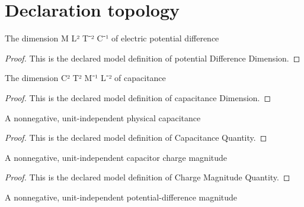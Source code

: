 \section{Declaration topology}
\begin{definition}
  \label{def:physics:phyx-mini-0880:phyxminiproblems-problemphyxmini0880-potentialdifferencedimension}
  The dimension M L² T⁻² C⁻¹ of electric potential difference
\end{definition}
\begin{proof}
  This is the declared model definition of potential Difference Dimension.
\end{proof}
\begin{definition}
  \label{def:physics:phyx-mini-0880:phyxminiproblems-problemphyxmini0880-capacitancedimension}
  The dimension C² T² M⁻¹ L⁻² of capacitance
\end{definition}
\begin{proof}
  This is the declared model definition of capacitance Dimension.
\end{proof}
\begin{definition}
  \label{def:physics:phyx-mini-0880:phyxminiproblems-problemphyxmini0880-capacitancequantity}
  A nonnegative, unit-independent physical capacitance
\end{definition}
\begin{proof}
  This is the declared model definition of Capacitance Quantity.
\end{proof}
\begin{definition}
  \label{def:physics:phyx-mini-0880:phyxminiproblems-problemphyxmini0880-chargemagnitudequantity}
  A nonnegative, unit-independent capacitor charge magnitude
\end{definition}
\begin{proof}
  This is the declared model definition of Charge Magnitude Quantity.
\end{proof}
\begin{definition}
  \label{def:physics:phyx-mini-0880:phyxminiproblems-problemphyxmini0880-potentialdifferencequantity}
  A nonnegative, unit-independent potential-difference magnitude
\end{definition}
